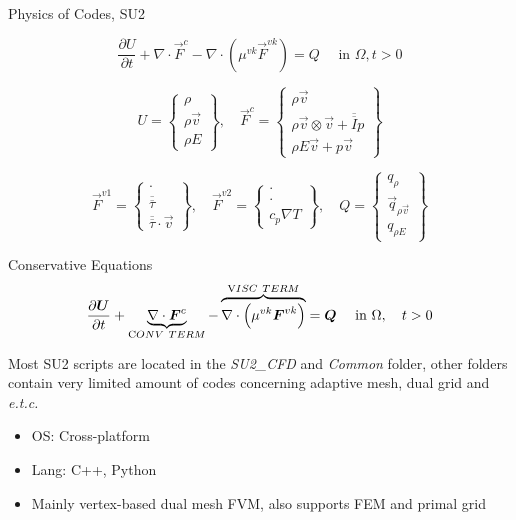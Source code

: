 \begin{frame}{Physics of Codes, SU2}


\begin{equation*}
\frac{\partial U}{\partial t}+\nabla \cdot \vec{F}^{c}-\nabla \cdot\left(\mu^{v k} \vec{F}^{v k}\right)=Q \quad \text { in } \Omega, t>0
\end{equation*}


\begin{equation*}
U=\left\{\begin{array}{c}{\rho } \\ {\rho \vec{v} } \\ {\rho E}\end{array}\right\},\quad
\vec{F}^{c}=\left\{\begin{array}{c}{\rho \vec{v}} \\ {\rho \vec{v} \otimes \vec{v}+\overline{\overline{I}} p} \\ {\rho E \vec{v}+p \vec{v}}\end{array}\right\}
\end{equation*}

\begin{equation*}
\vec{F}^{v1}=\left\{\begin{array}{c}{\cdot} \\ {\overline{\overline{\tau}}} \\ {\overline{\overline{\tau}}\cdot \vec{v}}\end{array}\right\},\quad
\vec{F}^{v2}=\left\{\begin{array}{c}{\cdot} \\ {\cdot} \\ {c_p \nabla T}\end{array}\right\},\quad
Q=\left\{\begin{array}{c}{q_\rho} \\ {\vec{q}_{\rho\vec{v}}} \\ {q_{\rho E}}\end{array}\right\}
\end{equation*}

\end{frame}

\begin{frame}{Conservative Equations}
\begin{equation}
\frac{\partial \boldsymbol{U}}{\partial t}+\underbrace{\nabla \cdot \boldsymbol{F}^{c}}_{\text CONV\ TERM}-\overbrace{\nabla \cdot\left(\mu^{v k} \boldsymbol{F}^{v k}\right)}^{\text VISC\ TERM}=\boldsymbol{Q} \quad \text { in }\Omega,  \quad t>0
\end{equation}

Most SU2 scripts are located in the \textit{SU2\_CFD} and \textit{Common} folder, other folders contain very limited amount of codes concerning adaptive mesh, dual grid and \textit{e.t.c.} 

\begin{itemize}
    \item OS: Cross-platform
    \item Lang: C++, Python
    \item Mainly vertex-based dual mesh FVM, also supports FEM and primal grid
\end{itemize}
\end{frame}

